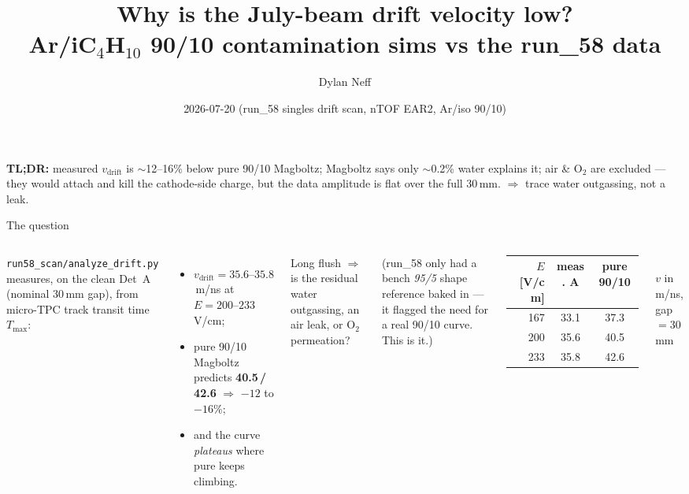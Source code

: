 \documentclass[10pt,aspectratio=169]{beamer}
\title{\textbf{Why is the July-beam drift velocity low?}\\
\large Ar/iC$_4$H$_{10}$ 90/10 contamination sims vs the run\_58 data}
\author{Dylan Neff}
\date{2026-07-20 \quad (run\_58 singles drift scan, nTOF EAR2, Ar/iso 90/10)}
\newcommand{\good}[1]{\textcolor{okgreen}{#1}}
\newcommand{\bad}[1]{\textcolor{okred}{#1}}
\newcommand{\wat}[1]{\textcolor{okblue}{#1}}
\begin{document}
\begin{frame}
  \titlepage
  \vfill
  \centering\small
  \textbf{TL;DR:}\; measured $v_\mathrm{drift}$ is \bad{$\sim$12--16\% below} pure 90/10 Magboltz;\;
  Magboltz says only \wat{$\sim$0.2\% water} explains it;\;
  \good{air \& O$_2$ are excluded} --- they would attach and kill the cathode-side charge,
  but the data amplitude is \good{flat over the full 30\,mm}. $\Rightarrow$ \wat{trace water outgassing, not a leak}.
\end{frame}

\begin{frame}{The question}
  \begin{columns}[T]
    \texttt{run58\_scan/analyze\_drift.py} measures, on the clean Det~A (nominal
    30\,mm gap), from micro-TPC track transit time $T_\mathrm{max}$:
    \begin{itemize}
      \item $v_\mathrm{drift}\!=\!35.6\text{--}35.8$\,\textmu m/ns at $E=200\text{--}233$\,V/cm;
      \item pure 90/10 Magboltz predicts \textbf{40.5\,/\,42.6} $\Rightarrow$ \bad{$-12$ to $-16\%$};
      \item and the curve \emph{plateaus} where pure keeps climbing.
    \end{itemize}
    \vspace{0.4em}
    Long flush $\Rightarrow$ is the residual \wat{water outgassing}, an \bad{air leak},
    or \bad{O$_2$ permeation}?
    \vspace{0.4em}

    {\footnotesize (run\_58 only had a bench \emph{95/5} shape reference baked in ---
    it flagged the need for a real 90/10 curve. This is it.)}

    \centering
    \footnotesize
    \begin{tabular}{rcc}
      \toprule
      $E$ [V/cm] & meas. A & pure 90/10 \\
      \midrule
      167 & 33.1 & 37.3 \\
      200 & 35.6 & 40.5 \\
      233 & 35.8 & 42.6 \\
      \bottomrule
    \end{tabular}
    \\[0.3em]
    {\scriptsize $v$ in \textmu m/ns, gap $=30$\,mm}
  \end{columns}
\end{frame}
\end{document}
